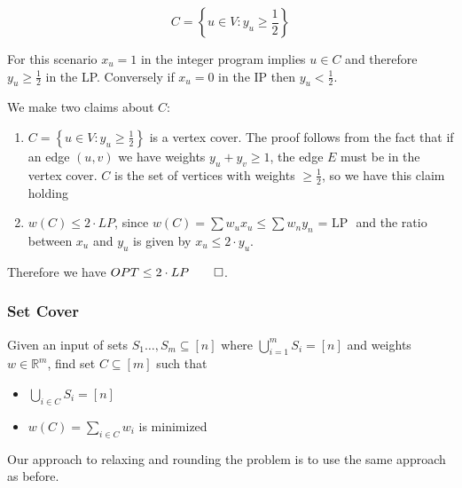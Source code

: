 \documentclass[../notes.tex]{subfiles}
\begin{document}
\begin{equation}
    C = \left\{  u \in V : y_u \ge  \frac{1}{2} \right\} 
\end{equation}


For this scenario $ x_u = 1 $ in the integer program implies $ u \in C $ and therefore $ y_u \ge \frac{1}{2} $ in the LP. Conversely if $ x_u = 0 $ in the IP then $ y_u < \frac{1}{2} $.

We make two claims about $ C $:

\begin{enumerate}
    \item $ C = \left\{  u \in V : y_u \ge  \frac{1}{2} \right\} $ is a vertex cover. The proof follows from the fact that if an edge $ (u,v) $ we have weights $ y_u + y_v \ge  1 $, the edge $ E $ must be in the vertex cover. $ C $ is the set of vertices with weights $ \ge \frac{1}{2} $, so we have this claim holding
    \item $ w(C) \le  2 \cdot  LP$, since $ w(C) = \sum w_u x_u \le \sum w_n y_n \text{ = LP } $ and the ratio between $ x_u $ and $ y_u $ is given by $ x_u \le  2 \cdot  y_u $.
\end{enumerate}

Therefore we have $ OPT \le  2 \cdot  LP \qed $.



\subsubsection{Set Cover}

Given an input of sets $ S_1 \ldots,  S_m \subseteq [n] $ where $ \bigcup^m_{i=1} S_i = [n]  $ and weights $ w \in \mathbb{R}^m $, find set $ C \subseteq [m] $ such that

\begin{itemize}
    \item $ \bigcup_{i \in C} S_i = [n] $
    \item $ w(C) = \sum_{i \in C} w_i $ is minimized
\end{itemize}


Our approach to relaxing and rounding the problem is to use the same approach as before.
\end{document}
